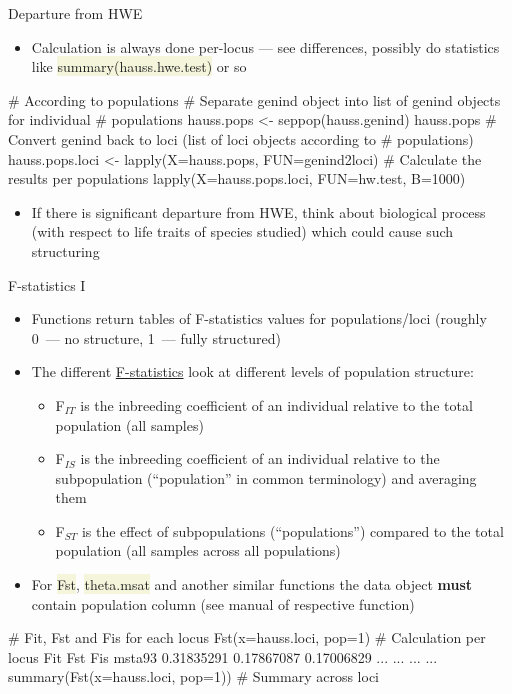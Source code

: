 \documentclass[compress, xelatex, 11pt, xcolor=svgnames, aspectratio=169, url={hyphens, lowtilde}]{beamer}
\renewcommand{\texttt}[1]{\colorbox{Beige}{{\ttfamily #1}}}
\begin{document}
\begin{frame}[fragile]{Departure from HWE}
	\begin{itemize}
		\item Calculation is always done per-locus --- see differences, possibly do statistics like \texttt{summary(hauss.hwe.test)} or so
	\end{itemize}
	\begin{spluscode}
    # According to populations
    # Separate genind object into list of genind objects for individual
    # populations
    hauss.pops <- seppop(hauss.genind)
    hauss.pops
    # Convert genind back to loci (list of loci objects according to
    # populations)
    hauss.pops.loci <- lapply(X=hauss.pops, FUN=genind2loci)
    # Calculate the results per populations
    lapply(X=hauss.pops.loci, FUN=hw.test, B=1000)
	\end{spluscode}
	\begin{itemize}
		\item If there is significant departure from HWE, think about biological process (with respect to life traits of species studied) which could cause such structuring
	\end{itemize}
\end{frame}

\begin{frame}[fragile]{F-statistics I}
	\begin{itemize}
		\item Functions return tables of F-statistics values for populations/loci (roughly 0~--- no structure, 1~--- fully structured)
		\item The different \href{https://en.wikipedia.org/wiki/F-statistics}{F-statistics} look at different levels of population structure:
		\begin{itemize}
			\item F$_{IT}$ is the inbreeding coefficient of an individual relative to the total population (all samples)
			\item F$_{IS}$ is the inbreeding coefficient of an individual relative to the subpopulation (\enquote{population} in common terminology) and averaging them
			\item F$_{ST}$ is the effect of subpopulations (\enquote{populations}) compared to the total population (all samples across all populations)
		\end{itemize}
		\item For \texttt{Fst}, \texttt{theta.msat} and another similar functions the data object \textbf{must} contain population column (see manual of respective function)
	\end{itemize}
	\begin{spluscode}
    # Fit, Fst and Fis for each locus
    Fst(x=hauss.loci, pop=1) # Calculation per locus
                    Fit        Fst         Fis
    msta93   0.31835291 0.17867087  0.17006829
       ...          ...        ...         ...
    summary(Fst(x=hauss.loci, pop=1)) # Summary across loci
	\end{spluscode}
\end{frame}
\end{document}
